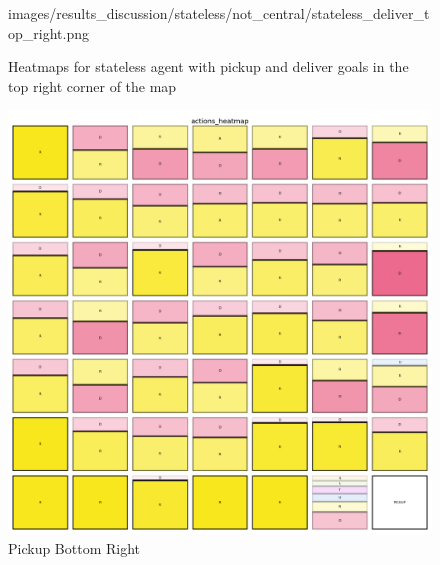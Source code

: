 \begin{figure}[h!]
\begin{minipage}[b]{0.45\textwidth}
{      images/results_discussion/stateless/not_central/stateless_deliver_top_right.png
    }
    \caption{Deliver Top Right}
    \label{fig:stateless_deliver_top_right}
  \end{minipage}
  \caption{Heatmaps for stateless agent with pickup and deliver goals in the top
  right corner of the map}
  \label{fig:stateless_top_right}
\end{figure}
\vspace{5mm}

\begin{figure}[h!]
  \centering
  \begin{minipage}[b]{0.45\textwidth}
    \centering
    \includegraphics[width=\textwidth]{
      images/results_discussion/stateless/not_central/stateless_pickup_bottom_right.png
    }
    \caption{Pickup Bottom Right}
    \label{fig:stateless_pickup_bottom_right}
  \end{minipage}
  \hfill
  \begin{minipage}[b]{0.45\textwidth}
    \centering

\end{minipage}
\end{figure}
